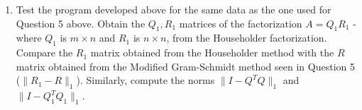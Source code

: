 \documentclass[11pt]{article}
\begin{document}
\begin{enumerate}
	\item Test the program developed above for the same data as the one used for Question 5 above.  Obtain the \(Q_1, R_1\) matrices of the factorization \(A = Q_1R_1\) - where \(Q_1\) is \(m \times n\) and \(R_1\) is \(n \times n\), from the Householder factorization.  Compare the \(R_1\) matrix obtained from the Householder method with the \(R\) matrix obtained from the Modified Gram-Schmidt method seen in Question 5 (\(\lVert R_1 - R \rVert_1\)).  Similarly, compute the norms \(\lVert I - Q^T Q \rVert_1\) and \(\lVert I - Q_1^T Q_1 \rVert_1\).
\end{enumerate}
\end{document}
